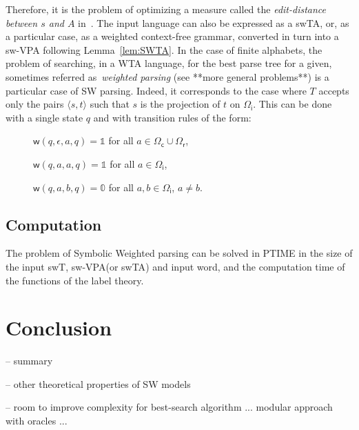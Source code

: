 \documentclass[runningheads]{llncs}
\def\<#1>{\langle #1 \rangle}
\newcommand{\zero}{\mathbb{0}}
\newcommand{\one}{\mathbb{1}}
\def\SWT{\textsf{swT}\xspace}
\def\SWTA{\textsf{swTA}\xspace}
\def\SWVPA{\textsf{sw-VPA}\xspace}
\def\wei{\mathsf{w}}
\def\Omegai{{\Omega_\mathsf{i}}}
\def\Omegac{{\Omega_\mathsf{c}}}
\def\Omegar{{\Omega_\mathsf{r}}}
\begin{document}
\noindent 
Therefore, it is the problem of optimizing a measure 
called the \emph{edit-distance between $s$ and $A$} in~\cite{Mohri03EDWA}.
%
The input language can also be expressed as a \SWTA, or, 
as a particular case, as a weighted context-free grammar, 
converted in turn into a \SWVPA following Lemma~\ref{lem:SWTA}.
%
In the case of finite alphabets, 
the problem of searching, in a WTA language, 
for the best parse tree for a given,  
sometimes referred as~\emph{weighted parsing}
(see \cite{Goodman99SemiringParsing,MorbitzVogler19weighted-parsing} **more general problems**)
is a particular case of SW parsing.
%
Indeed, it corresponds to the case where $T$
accepts only the pairs $\<s, t>$ such that 
$s$ is the projection of $t$ on $\Omegai$. 
This can be done with a single state $q$ and 
with transition rules of the form:
\begin{description}
\item[] $\wei(q, \epsilon, a, q) = \one$ for all $a \in \Omegac \cup \Omegar$,
\item[] $\wei(q, a, a, q) = \one$ for all $a \in \Omegai$,
\item[] $\wei(q, a, b, q) = \zero$ for all $a, b \in \Omegai$, $a \neq b$.
\end{description}


\subsection{Computation}

\begin{proposition}
The problem of Symbolic Weighted  parsing 
can be solved in PTIME in the size of the input \SWT, \SWVPA (or \SWTA) and input word, 
and the computation time of the functions of the label theory.
\end{proposition}
%


%




\section*{Conclusion}

\noindent
-- summary 

\noindent
-- other theoretical properties of SW models

\noindent
-- room to improve complexity for best-search algorithm
... modular approach with oracles ...
\end{document}
